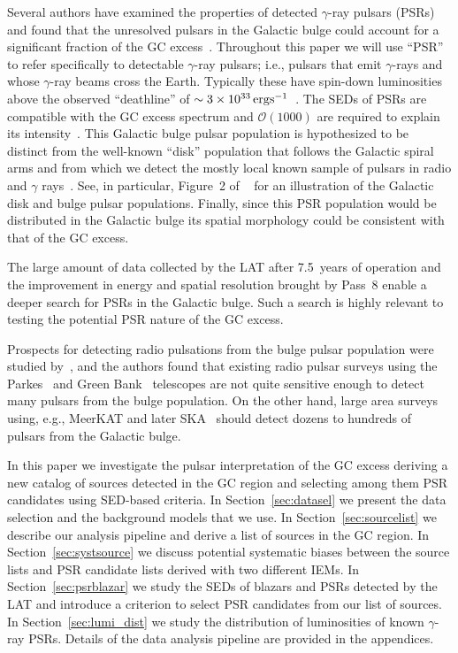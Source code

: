 \documentclass[iop]{emulateapj}
\begin{document}
Several authors have examined the properties of detected $\gamma$-ray
pulsars (PSRs) and found that the unresolved pulsars in the Galactic
bulge could account for a significant fraction of the GC
excess~\citep{2013MNRAS.436.2461M,Gregoire:2013yta,2014JHEAp...3....1Y,Petrovic:2014xra,2015ApJ...812...15B,OLeary:2015qpx,OLeary:2016cwz}.
Throughout this paper we will use ``PSR'' to refer
specifically to detectable $\gamma$-ray pulsars; i.e., pulsars that
emit $\gamma$-rays and whose $\gamma$-ray beams cross the Earth.
Typically these have spin-down luminosities above the observed
``deathline'' of $\sim 3 \times 10^{33} {\rm \,erg}{\rm
  s}^{-1}$~\citep{2016A&A...587A.109G}. The SEDs of PSRs are
compatible with the GC excess spectrum and $\mathcal{O}(1000)$ are
required to explain its intensity~\citep{Hooper:2010mq,
  2011JCAP...03..010A, Calore:2014oga,Cholis:2014lta}.  This
Galactic bulge pulsar population is hypothesized to be
distinct from the well-known ``disk'' population that follows the
Galactic spiral arms and from which we detect the mostly local known
sample of pulsars in radio and $\gamma$
rays~\citep{2005AJ....129.1993M,2013ApJS..208...17A}.  See, in
particular, Figure~2 of ~\citet{Calore:2015bsx} for an illustration
of the Galactic disk and bulge pulsar populations.  Finally, since
this PSR population would be distributed in the Galactic bulge its
spatial morphology could be consistent with that of the GC excess.

The large amount of data collected by the LAT after 7.5~years of
operation and the improvement in energy and spatial resolution brought
by Pass~8 enable a deeper search for PSRs in the Galactic bulge.  Such
a search is highly relevant to testing the potential PSR nature of the
GC excess.

Prospects for detecting radio pulsations from the bulge pulsar population
were studied by~\citet{Calore:2015bsx}, and the authors found that
existing radio pulsar surveys using the
Parkes~\citep{2010MNRAS.409..619K} and Green Bank~\citep{2013CQGra..30v4003S}
telescopes are not quite sensitive enough
to detect many pulsars from the bulge population.  On the other hand, large
area surveys using, e.g., MeerKAT and later
SKA~\citep{2015aska.confE..36K} should detect dozens to
hundreds of pulsars from the Galactic bulge.

In this paper we investigate the pulsar interpretation of the GC
excess deriving a new catalog of sources detected in the GC region and selecting among them PSR candidates using SED-based criteria.  
In Section~\ref{sec:datasel} we present the data selection
and the background models that we use. In Section~\ref{sec:sourcelist}
we describe our analysis pipeline and derive a list of sources in the
GC region. In Section~\ref{sec:systsource} we discuss potential 
systematic biases between the source lists and PSR candidate lists derived with two different IEMs.
In Section~\ref{sec:psrblazar} we study the SEDs of blazars
and PSRs detected by the LAT and introduce a criterion to select PSR
candidates from our list of sources. In Section~\ref{sec:lumi_dist} we
study the distribution of luminosities of known $\gamma$-ray PSRs.
Details of the data analysis pipeline
are provided in the appendices.
\end{document}
